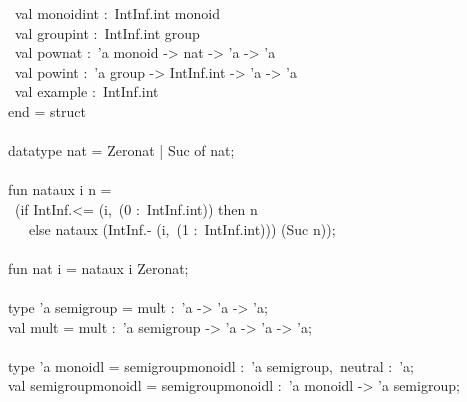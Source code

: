 \begin{isabellebody}
\begin{isamarkuptext}
\hspace*{0pt} ~val monoid{}int :~IntInf.int monoid\\
\hspace*{0pt} ~val group{}int :~IntInf.int group\\
\hspace*{0pt} ~val pow{}nat :~'a monoid -> nat -> 'a -> 'a\\
\hspace*{0pt} ~val pow{}int :~'a group -> IntInf.int -> 'a -> 'a\\
\hspace*{0pt} ~val example :~IntInf.int\\
\hspace*{0pt}end = struct\\
\hspace*{0pt}\\
\hspace*{0pt}datatype nat = Zero{}nat | Suc of nat;\\
\hspace*{0pt}\\
\hspace*{0pt}fun nat{}aux i n =\\
\hspace*{0pt} ~(if IntInf.<= (i,~(0 :~IntInf.int)) then n\\
\hspace*{0pt} ~~~else nat{}aux (IntInf.- (i,~(1 :~IntInf.int))) (Suc n));\\
\hspace*{0pt}\\
\hspace*{0pt}fun nat i = nat{}aux i Zero{}nat;\\
\hspace*{0pt}\\
\hspace*{0pt}type 'a semigroup = {}mult :~'a -> 'a -> 'a{};\\
\hspace*{0pt}val mult = {}mult :~'a semigroup -> 'a -> 'a -> 'a;\\
\hspace*{0pt}\\
\hspace*{0pt}type 'a monoidl = {}semigroup{}monoidl :~'a semigroup,~neutral :~'a{};\\
\hspace*{0pt}val semigroup{}monoidl = {}semigroup{}monoidl :~'a monoidl -> 'a semigroup;\\

\end{isamarkuptext}
\end{isabellebody}
